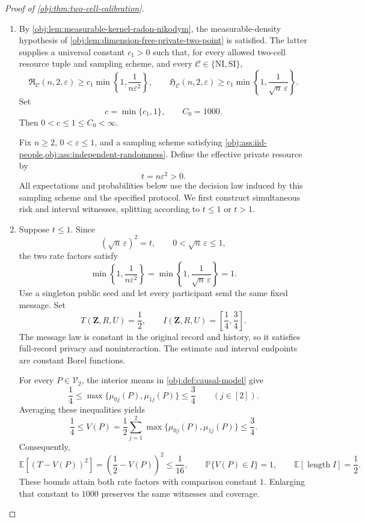 \begin{proof}[Proof of \cref{obj:thm:two-cell-calibration}]
\begin{enumerate}
\item
By \cref{obj:lem:measurable-kernel-radon-nikodym}, the measurable-density hypothesis of \cref{obj:lem:dimension-free-private-two-point} is satisfied. The latter supplies a universal constant \(c_1>0\) such that, for every allowed two-cell resource tuple and sampling scheme, and every \(\mathcal C\in\{\mathrm{NI},\mathrm{SI}\}\),
\[
\mathfrak R_{\mathcal C}(n,2,\varepsilon)
\ge c_1\min\left\{1,\frac1{n\varepsilon^2}\right\},
\qquad
\mathfrak H_{\mathcal C}(n,2,\varepsilon)
\ge c_1\min\left\{1,\frac1{\sqrt n\,\varepsilon}\right\}.
\]
Set
\[
c=\min\{c_1,1\},
\qquad C_0=1000.
\]
Then \(0<c\le1\le C_0<\infty\).

Fix \(n\ge2\), \(0<\varepsilon\le1\), and a sampling scheme satisfying
\cref{obj:ass:iid-people,obj:ass:independent-randomness}. Define the effective private resource by
\[
t=n\varepsilon^2>0.
\]
All expectations and probabilities below use the decision law induced by this sampling scheme and the specified protocol. We first construct simultaneous risk and interval witnesses, splitting according to \(t\le1\) or \(t>1\).

\item
Suppose \(t\le1\). Since
\[
(\sqrt n\,\varepsilon)^2=t,
\qquad 0<\sqrt n\,\varepsilon\le1,
\]
the two rate factors satisfy
\[
\min\left\{1,\frac1{n\varepsilon^2}\right\}
=
\min\left\{1,\frac1{\sqrt n\,\varepsilon}\right\}
=1.
\]
Use a singleton public seed and let every participant send the same fixed message. Set
\[
T(\mathbf Z,R,U)=\frac12,
\qquad
I(\mathbf Z,R,U)=\left[\frac14,\frac34\right].
\]
The message law is constant in the original record and history, so it satisfies full-record privacy and noninteraction. The estimate and interval endpoints are constant Borel functions.

For every \(P\in\mathcal V_2\), the interior means in
\cref{obj:def:causal-model} give
\[
\frac14\le
\max\{\mu_{0j}(P),\mu_{1j}(P)\}
\le\frac34
\qquad(j\in[2]).
\]
Averaging these inequalities yields
\[
\frac14\le
V(P)=\frac12\sum_{j=1}^{2}
\max\{\mu_{0j}(P),\mu_{1j}(P)\}
\le\frac34.
\]
Consequently,
\[
\mathbb E[(T-V(P))^2]
=\left(\frac12-V(P)\right)^2
\le\frac1{16},
\qquad
\mathbb P\{V(P)\in I\}=1,
\qquad
\mathbb E[\operatorname{length}I]=\frac12.
\]
These bounds attain both rate factors with comparison constant \(1\). Enlarging that constant to \(1000\) preserves the same witnesses and coverage.


\end{enumerate}
\end{proof}

